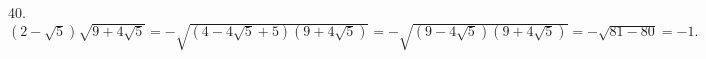 40. $(2-\sqrt{5})\sqrt{9+4\sqrt{5}}=-\sqrt{(4-4\sqrt{5}+5)(9+4\sqrt{5})}=-\sqrt{(9-4\sqrt{5})(9+4\sqrt{5})}=-\sqrt{81-80}=-1.$\\
